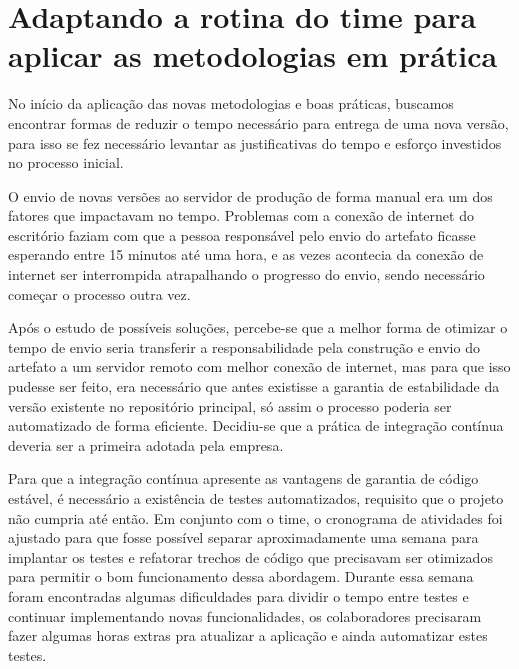 \documentclass[
12pt,				%
openright,			%
oneside,			%
a4paper,			%
english,			%
french,				%
spanish,			%
brazil,				%
]{abntex2}
\begin{document}
\section{Adaptando a rotina do time para aplicar as metodologias em prática}

No início da aplicação das novas metodologias e boas práticas, buscamos encontrar formas de reduzir o tempo necessário para entrega de uma nova versão, para isso se fez necessário levantar as justificativas do tempo e esforço investidos no processo inicial.

O envio de novas versões ao servidor de produção de forma manual era um dos fatores que impactavam no tempo. Problemas com a conexão de internet do escritório faziam com que a pessoa responsável pelo envio do artefato ficasse esperando entre 15 minutos até uma hora, e as vezes acontecia da conexão de internet ser interrompida atrapalhando o progresso do envio, sendo necessário começar o processo outra vez.

Após o estudo de possíveis soluções, percebe-se que a melhor forma de otimizar o tempo de envio seria transferir a responsabilidade pela construção e envio do artefato a um servidor remoto com melhor conexão de internet, mas para que isso pudesse ser feito, era necessário que antes existisse a garantia de estabilidade da versão existente no repositório principal, só assim o processo poderia ser automatizado de forma eficiente. Decidiu-se que a prática de integração contínua deveria ser a primeira adotada pela empresa.

Para que a integração contínua apresente as vantagens de garantia de código estável, é necessário a existência de testes automatizados, requisito que o projeto não cumpria até então. Em conjunto com o time, o cronograma de atividades foi ajustado para que fosse possível separar aproximadamente uma semana para implantar os testes e refatorar trechos de código que precisavam ser otimizados para permitir o bom funcionamento dessa abordagem. Durante essa semana foram encontradas algumas dificuldades para dividir o tempo entre testes e continuar implementando novas funcionalidades, os colaboradores precisaram fazer algumas horas extras pra atualizar a aplicação e ainda automatizar estes testes.
\end{document}
